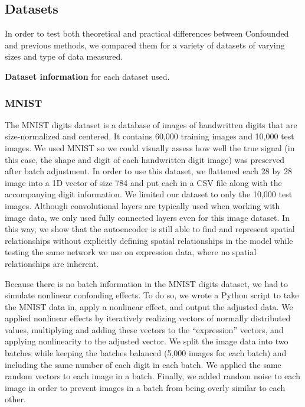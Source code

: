 \documentclass[12pt]{article}
\makeatletter
\newcommand{\pdfbookmarkraised}[3]{\Hy@raisedlink{\pdfbookmark[#1]{#2}{#3}}}
\makeatother
\begin{document}
\subsection{Datasets}

In order to test both theoretical and practical differences between Confounded and previous methods, we compared them for a variety of datasets of varying sizes and type of data measured.

\begin{table}
	\centering
	
	\caption[Dataset information]{
		\pdfbookmarkraised{1}{Table \ref{tab:datasets}: Dataset information}{tab:datasets}
		\textbf{Dataset information} for each dataset used.
	}
	\label{tab:datasets}
\end{table}

\subsubsection{MNIST}

The MNIST digits dataset \cite{lecun_mnist_nodate} is a database of images of handwritten digits that are size-normalized and centered.
It contains 60,000 training images and 10,000 test images.
We used MNIST so we could visually assess how well the true signal (in this case, the shape and digit of each handwritten digit image) was preserved after batch adjustment.
In order to use this dataset, we flattened each 28 by 28 image into a 1D vector of size 784 and put each in a CSV file along with the accompanying digit information.
We limited our dataset to only the 10,000 test images.
Although convolutional layers are typically used when working with image data, we only used fully connected layers even for this image dataset.
In this way, we show that the autoencoder is still able to find and represent spatial relationships without explicitly defining spatial relationships in the model while testing the same network we use on expression data, where no spatial relationships are inherent.


Because there is no batch information in the MNIST digits dataset, we had to simulate nonlinear confonding effects.
To do so, we wrote a Python script to take the MNIST data in, apply a nonlinear effect, and output the adjusted data.
We applied nonlinear effects by iteratively realizing vectors of normally distributed values, multiplying and adding these vectors to the ``expression'' vectors, and applying nonlinearity to the adjusted vector.
We split the image data into two batches while keeping the batches balanced (5,000 images for each batch) and including the same number of each digit in each batch.
We applied the same random vectors to each image in a batch.
Finally, we added random noise to each image in order to prevent images in a batch from being overly similar to each other.
\end{document}
